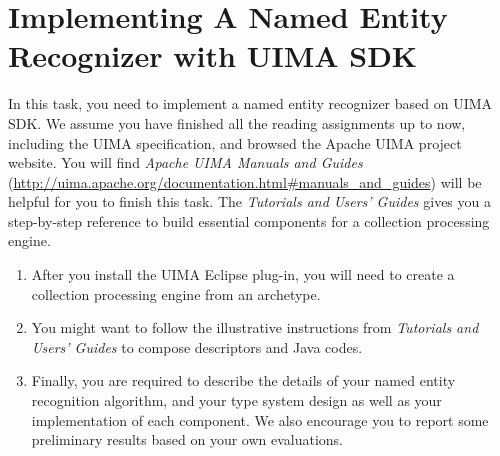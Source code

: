 
\chapter{Implementing A Named Entity Recognizer with UIMA SDK}

In this task, you need to implement a named entity recognizer based on UIMA SDK.
We assume you have finished all the reading assignments up to now, including the
UIMA specification, and browsed the Apache UIMA project website. You will find
\emph{Apache UIMA Manuals and Guides}
(\url{http://uima.apache.org/documentation.html#manuals_and_guides}) will be
helpful for you to finish this task. The \emph{Tutorials and Users' Guides}
gives you a step-by-step reference to build essential components for a
collection processing engine.

\begin{enumerate}

\item After you install the UIMA Eclipse plug-in, you will need to create a
collection processing engine from an archetype.

\item You might want to follow the illustrative instructions from
\emph{Tutorials and Users' Guides} to compose descriptors and Java codes.

\item Finally, you are required to describe the details of your named entity
recognition algorithm, and your type system design as well as your
implementation of each component. We also encourage you to report some
preliminary results based on your own evaluations.

\end{enumerate}









